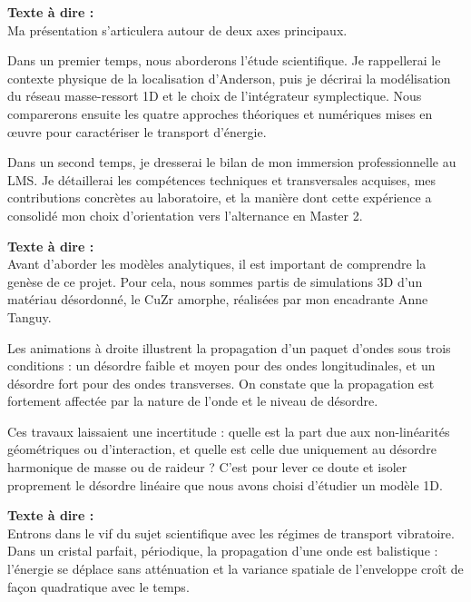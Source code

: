 \documentclass[11pt,a4paper]{article}
\begin{document}
\begin{tcolorbox}[colback=blue!5,colframe=blue!75!black,title=Slide 2 : Table des Matières --- 0:45 à 1:15]
\textbf{Texte à dire :} \\
\og  Ma présentation s'articulera autour de deux axes principaux. 

Dans un premier temps, nous aborderons l'étude scientifique. Je rappellerai le contexte physique de la localisation d'Anderson, puis je décrirai la modélisation du réseau masse-ressort 1D et le choix de l'intégrateur symplectique. Nous comparerons ensuite les quatre approches théoriques et numériques mises en œuvre pour caractériser le transport d'énergie.

Dans un second temps, je dresserai le bilan de mon immersion professionnelle au LMS. Je détaillerai les compétences techniques et transversales acquises, mes contributions concrètes au laboratoire, et la manière dont cette expérience a consolidé mon choix d'orientation vers l'alternance en Master 2. \fg{}
\begin{tcolorbox}[colback=blue!5,colframe=blue!75!black,title=Slide 2bis : Origine du Projet : Des simulations 3D à la chaîne 1D --- 1:15 à 2:00]
\textbf{Texte à dire :} \\
\og Avant d'aborder les modèles analytiques, il est important de comprendre la genèse de ce projet. Pour cela, nous sommes partis de simulations 3D d'un matériau désordonné, le CuZr amorphe, réalisées par mon encadrante Anne Tanguy.

Les animations à droite illustrent la propagation d'un paquet d'ondes sous trois conditions : un désordre faible et moyen pour des ondes longitudinales, et un désordre fort pour des ondes transverses. On constate que la propagation est fortement affectée par la nature de l'onde et le niveau de désordre.

Ces travaux laissaient une incertitude : quelle est la part due aux non-linéarités géométriques ou d'interaction, et quelle est celle due uniquement au désordre harmonique de masse ou de raideur ? C'est pour lever ce doute et isoler proprement le désordre linéaire que nous avons choisi d'étudier un modèle 1D. \fg{}
\end{tcolorbox}

\begin{tcolorbox}[colback=blue!5,colframe=blue!75!black,title=Slide 3 : Introduction : Phénomènes de transport vibratoire --- 2:00 à 3:00]
\textbf{Texte à dire :} \\
\og  Entrons dans le vif du sujet scientifique avec les régimes de transport vibratoire. Dans un cristal parfait, périodique, la propagation d'une onde est balistique : l'énergie se déplace sans atténuation et la variance spatiale de l'enveloppe croît de façon quadratique avec le temps.


\end{tcolorbox}
\end{tcolorbox}
\end{document}

